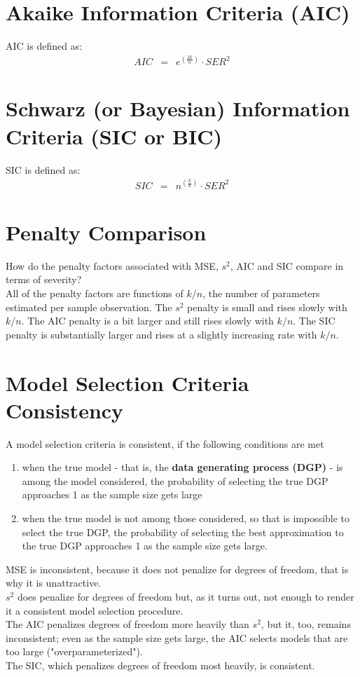 \section{Akaike Information Criteria (AIC)}
AIC is defined as:
\begin{eqnarray}
AIC &=& e^{\left(\frac{2k}{n}\right)}\cdot SER^{2}
\end{eqnarray}

\section{Schwarz (or Bayesian) Information Criteria (SIC or BIC)}
SIC is defined as:
\begin{eqnarray}
SIC &=& n^{\left(\frac{k}{n}\right)}\cdot SER^{2}
\end{eqnarray}

\section{Penalty Comparison}
How do the penalty factors associated with MSE, $s^{2}$, AIC and SIC compare in terms of severity?\\
All of the penalty factors are functions of $k/n$, the number of parameters estimated per sample observation. The $s^{2}$ penalty is small and rises slowly with $k/n$. The AIC penalty is a bit larger and still rises slowly with $k/n$. The SIC penalty is substantially larger and rises at a slightly increasing rate with $k/n$.

\section{Model Selection Criteria Consistency}
A model selection criteria is consistent, if the following conditions are met
\begin{enumerate}
	\item when the true model - that is, the \textbf{data generating process (DGP)} - is among the model considered, the probability of selecting the true DGP approaches 1 as the sample size gets large
	\item when the true model is not among those considered, so that is impossible to select the true DGP, the probability of selecting the best approximation to the true DGP approaches 1 as the sample size gets large.
\end{enumerate}
MSE is inconsistent, because it does not penalize for degrees of freedom, that is why it is unattractive.\\
$s^{2}$ does penalize for degrees of freedom but, as it turns out, not enough to render it a consistent model selection procedure.\\
The AIC penalizes degrees of freedom more heavily than $s^{2}$, but it, too, remains inconsistent; even as the sample size gets large, the AIC selects models that are too large ("overparameterized").\\
The SIC, which penalizes degrees of freedom most heavily, is consistent.

